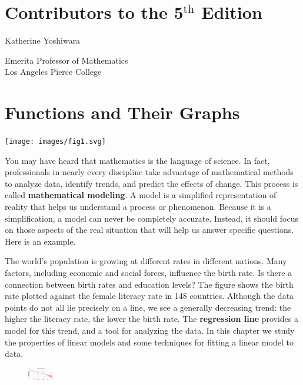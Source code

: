 \documentclass[10pt,]{book}
\newcommand{\terminology}[1]{\textbf{#1}}
\theoremstyle{plain}
\theoremstyle{definition}
\theoremstyle{definition}
\numberwithin{equation}{section}
\begin{document}
\chapter*{Contributors to the 5\(^\mathrm{th}\) Edition}\label{preface-2}
\hypertarget{kyoshiwara}{}\noindent%
\parbox[t]{0.35\textwidth}{Katherine Yoshiwara}%
\parbox[t]{0.65\textwidth}{Emerita Professor of Mathematics\\Los Angeles Pierce College\\}\par
\setcounter{tocdepth}{1}
\renewcommand*\contentsname{Contents}
\tableofcontents
\mainmatter
\typeout{************************************************}
\typeout{************************************************}
\chapter[Functions and Their Graphs]{Functions and Their Graphs}\label{chap1}
\typeout{************************************************}
\typeout{************************************************}
\texttt{[image: images/fig1.svg]}%
\par
You may have heard that mathematics is the language of science.  In fact, professionals in nearly every discipline take advantage of mathematical methods to analyze data, identify trends, and predict the effects of change.  This process is called \terminology{mathematical modeling}.  A model is a simplified representation of reality that helps us understand a process or phenomenon.  Because it is a simplification, a model can never be completely accurate.  Instead, it should focus on those aspects of the real situation that will help us answer specific questions. Here is an example. %
\par
The world's population is growing at different rates in different nations.  Many factors, including economic and social forces, influence the birth rate.  Is there a connection between birth rates and education levels?  The figure shows the birth rate plotted against the female literacy rate in 148 countries.  Although the data points do not all lie precisely on a line, we see a generally decreasing trend:  the higher the literacy rate, the lower the birth rate.  The \terminology{regression line} provides a model for this trend, and a tool for analyzing the data.  In this chapter we study the properties of linear models and some techniques for fitting a linear model to data.%
\leavevmode%
\begin{figure}
\centering
\includegraphics[width=0.100\textwidth,]{images/BirthRateVsFemaleLiteracy.svg}\end{figure}
\typeout{************************************************}
\typeout{************************************************}
\end{document}
